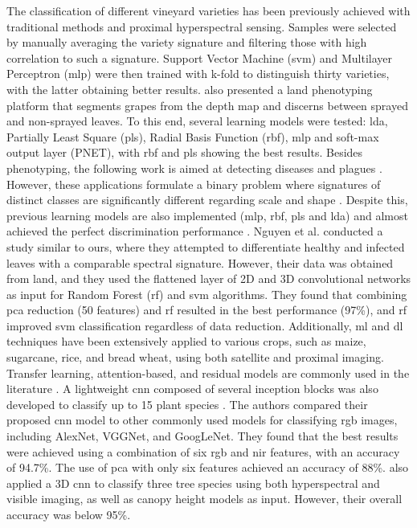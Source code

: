 The classification of different vineyard varieties has been previously achieved with traditional methods and proximal hyperspectral sensing. Samples were selected by manually averaging the variety signature and filtering those with high correlation to such a signature. Support Vector Machine (\acrshort{svm}) and Multilayer Perceptron (\acrshort{mlp}) were then trained with k-fold to distinguish thirty varieties, with the latter obtaining better results. \cite{kicherer_phenoliner_2017} also presented a land phenotyping platform that segments grapes from the depth map and discerns between sprayed and non-sprayed leaves. To this end, several learning models were tested: \acrshort{lda}, Partially Least Square (\acrshort{pls}), Radial Basis Function (\acrshort{rbf}), \acrshort{mlp} and soft-max output layer (PNET), with \acrshort{rbf} and \acrshort{pls} showing the best results. Besides phenotyping, the following work is aimed at detecting diseases \cite{nguyen_early_2021, bendel_detection_2020, bendel_evaluating_2020} and plagues \cite{mendes_vineinspector_2022}. However, these applications formulate a binary problem where signatures of distinct classes are significantly different regarding scale \cite{bendel_detection_2020} and shape \cite{bendel_detection_2020}. Despite this, previous learning models are also implemented (\acrshort{mlp}, \acrshort{rbf}, \acrshort{pls} and \acrshort{lda}) and almost achieved the perfect discrimination performance \cite{bendel_evaluating_2020}. Nguyen et al. \cite{nguyen_early_2021} conducted a study similar to ours, where they attempted to differentiate healthy and infected leaves with a comparable spectral signature. However, their data was obtained from land, and they used the flattened layer of 2D and 3D convolutional networks as input for Random Forest (\acrshort{rf}) and \acrshort{svm} algorithms. They found that combining \acrshort{pca} reduction (50 features) and \acrshort{rf} resulted in the best performance (97\%), and \acrshort{rf} improved \acrshort{svm} classification regardless of data reduction. Additionally, \acrshort{ml} and \acrshort{dl} techniques have been extensively applied to various crops, such as maize, sugarcane, rice, and bread wheat, using both satellite and proximal imaging. Transfer learning, attention-based, and residual models are commonly used in the literature \cite{zhang_classification_2022}. A lightweight \acrshort{cnn} composed of several inception blocks was also developed to classify up to 15 plant species \cite{liu_plant_2022}. The authors compared their proposed \acrshort{cnn} model to other commonly used models for classifying \acrshort{rgb} images, including AlexNet, VGGNet, and GoogLeNet. They found that the best results were achieved using a combination of six \acrshort{rgb} and \acrshort{nir} features, with an accuracy of 94.7\%. The use of \acrshort{pca} with only six features achieved an accuracy of 88\%. \cite{nezami_tree_2020} also applied a 3D \acrshort{cnn} to classify three tree species using both hyperspectral and visible imaging, as well as canopy height models as input. However, their overall accuracy was below 95\%.

